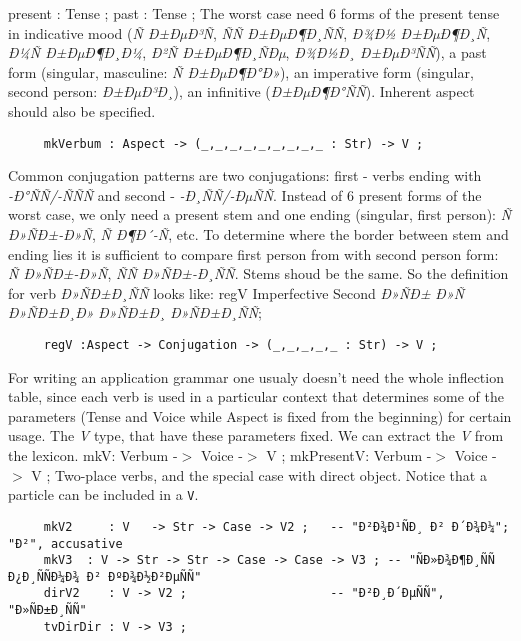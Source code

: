 \documentclass[11pt,a4paper]{article}
\begin{document}
present : Tense ;
past : Tense ;
The worst case need 6 forms of the present tense in indicative mood
(\textit{Ñ Ð±ÐµÐ³Ñ}, \textit{ÑÑ Ð±ÐµÐ¶Ð¸ÑÑ}, \textit{Ð¾Ð½ Ð±ÐµÐ¶Ð¸Ñ}, \textit{Ð¼Ñ Ð±ÐµÐ¶Ð¸Ð¼}, \textit{Ð²Ñ Ð±ÐµÐ¶Ð¸ÑÐµ}, \textit{Ð¾Ð½Ð¸ Ð±ÐµÐ³ÑÑ}),
a past form (singular, masculine: \textit{Ñ Ð±ÐµÐ¶Ð°Ð»}), an imperative form 
(singular, second person: \textit{Ð±ÐµÐ³Ð¸}), an infinitive (\textit{Ð±ÐµÐ¶Ð°ÑÑ}).
Inherent aspect should also be specified.

\begin{verbatim}
     mkVerbum : Aspect -> (_,_,_,_,_,_,_,_,_ : Str) -> V ;
\end{verbatim}

Common conjugation patterns are two conjugations: 
first - verbs ending with \textit{-Ð°ÑÑ/-ÑÑÑ} and second - \textit{-Ð¸ÑÑ/-ÐµÑÑ}.
Instead of 6 present forms of the worst case, we only need
a present stem and one ending (singular, first person):
\textit{Ñ Ð»ÑÐ±-Ð»Ñ}, \textit{Ñ Ð¶Ð´-Ñ}, etc. To determine where the border
between stem and ending lies it is sufficient to compare 
first person from with second person form:
\textit{Ñ Ð»ÑÐ±-Ð»Ñ}, \textit{ÑÑ Ð»ÑÐ±-Ð¸ÑÑ}. Stems shoud be the same.
So the definition for verb \textit{Ð»ÑÐ±Ð¸ÑÑ}  looks like:
regV Imperfective Second \textit{Ð»ÑÐ±} \textit{Ð»Ñ} \textit{Ð»ÑÐ±Ð¸Ð»} \textit{Ð»ÑÐ±Ð¸} \textit{Ð»ÑÐ±Ð¸ÑÑ};

\begin{verbatim}
     regV :Aspect -> Conjugation -> (_,_,_,_,_ : Str) -> V ; 
\end{verbatim}

For writing an application grammar one usualy doesn't need
the whole inflection table, since each verb is used in 
a particular context that determines some of the parameters
(Tense and Voice while Aspect is fixed from the beginning) for certain usage. 
The \textit{V} type, that have these parameters fixed. 
We can extract the \textit{V} from the lexicon.
mkV: Verbum -$>$ Voice -$>$  V ;
mkPresentV: Verbum -$>$ Voice -$>$ V ;
Two-place verbs, and the special case with direct object. Notice that
a particle can be included in a \texttt{V}.

\begin{verbatim}
     mkV2     : V   -> Str -> Case -> V2 ;   -- "Ð²Ð¾Ð¹ÑÐ¸ Ð² Ð´Ð¾Ð¼"; "Ð²", accusative
     mkV3  : V -> Str -> Str -> Case -> Case -> V3 ; -- "ÑÐ»Ð¾Ð¶Ð¸ÑÑ Ð¿Ð¸ÑÑÐ¼Ð¾ Ð² ÐºÐ¾Ð½Ð²ÐµÑÑ"
     dirV2    : V -> V2 ;                    -- "Ð²Ð¸Ð´ÐµÑÑ", "Ð»ÑÐ±Ð¸ÑÑ"
     tvDirDir : V -> V3 ; 
\end{verbatim}
\end{document}
